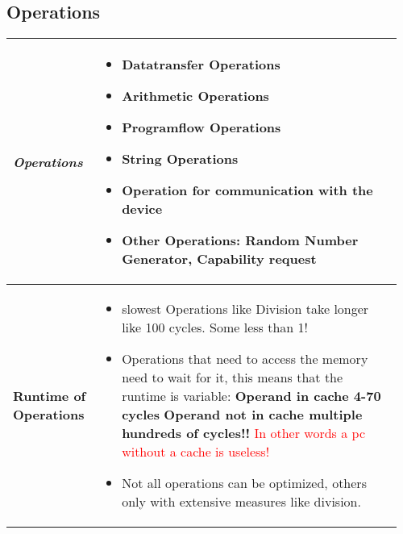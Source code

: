 \documentclass[main.tex,fontsize=8pt,paper=a4,paper=portrait,DIV=calc,]{scrartcl}
\begin{document}
\begin{table}[h!]
\subsection{Operations}
\begin{tabular}{|m{0.2\linewidth}|m{0.755\linewidth}|}
\hline
\emph{Operations} & 
\vspace{2mm}
\begin{itemize}
  \item \textbf{Datatransfer Operations}
  \item \textbf{Arithmetic Operations}
  \item \textbf{Programflow Operations}
  \item \textbf{String Operations}
  \item \textbf{Operation for communication with the device}
  \item \textbf{Other Operations: Random Number Generator, Capability request}
  \vspace{-3mm}
\end{itemize}\\
\hline
\textbf{Runtime of Operations} & 
\vspace{2mm}
\begin{itemize}
  \item slowest Operations like Division take longer like 100 cycles. Some less than 1!
  \item Operations that need to access the memory need to wait for it,\newline
  this means that the runtime is variable: \newline
  \textbf{Operand in cache 4-70 cycles}\newline
  \textbf{Operand not in cache multiple hundreds of cycles!!}\newline
  \textcolor{red}{In other words a pc without a cache is useless!}
\item Not all operations can be optimized, others only with extensive measures like division.
  \vspace{-3mm}
\end{itemize}\\
\hline
\hline
\end{tabular}
\end{table}
\pagebreak
\end{document}
